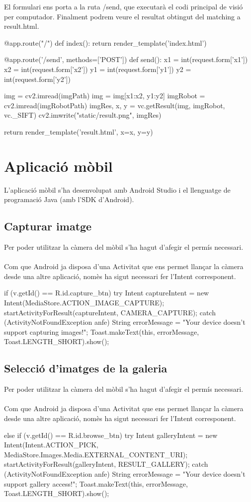El formulari ens porta a la ruta /send, que executarà el codi principal de visió per computador. Finalment podrem veure el resultat obtingut del matching a result.html.\\

		\begin{python}
@app.route("/")
def index():
	return render_template('index.html')

@app.route('/send', methods=['POST'])
def send():
	x1 = int(request.form['x1'])
	x2 = int(request.form['x2'])
	y1 = int(request.form['y1'])
	y2 = int(request.form['y2'])

	img = cv2.imread(imgPath)
	img = img[x1:x2, y1:y2]
	imgRobot = cv2.imread(imgRobotPath)
	imgRes, x, y = vc.getResult(img, imgRobot, vc._SIFT)
	cv2.imwrite("static/result.png", imgRes)

	return render_template('result.html', x=x, y=y)
		\end{python}


\section{Aplicació mòbil}
	L'aplicació mòbil s'ha desenvolupat amb Android Studio i el llenguatge de programació Java (amb l'SDK d'Android).
	\subsection{Capturar imatge}
		Per poder utilitzar la càmera del mòbil s'ha hagut d'afegir el permís necessari.\\\\
		Com que Android ja disposa d'una Activitat que ens permet llançar la càmera desde una altre aplicació, nomès ha sigut necessari fer l'Intent corresponent.\\
		\begin{java}
if (v.getId() == R.id.capture_btn) try {
	Intent captureIntent = new Intent(MediaStore.ACTION_IMAGE_CAPTURE);
	startActivityForResult(captureIntent, CAMERA_CAPTURE);
} catch (ActivityNotFoundException anfe) {
	String errorMessage = "Your device doesn't support capturing images!";
	Toast.makeText(this, errorMessage, Toast.LENGTH_SHORT).show();
}
		\end{java}
	\subsection{Selecció d'imatges de la galeria}
		Per poder utilitzar la càmera del mòbil s'ha hagut d'afegir el permís necessari.\\\\
		Com que Android ja disposa d'una Activitat que ens permet llançar la càmera desde una altre aplicació, nomès ha sigut necessari fer l'Intent corresponent.\\
		\begin{java}
else if (v.getId() == R.id.browse_btn) try {
	Intent galleryIntent = new Intent(Intent.ACTION_PICK, MediaStore.Images.Media.EXTERNAL_CONTENT_URI);
	startActivityForResult(galleryIntent, RESULT_GALLERY);
} catch (ActivityNotFoundException anfe) {
	String errorMessage = "Your device doesn't support gallery access!";
	Toast.makeText(this, errorMessage, Toast.LENGTH_SHORT).show();
}
		\end{java}
